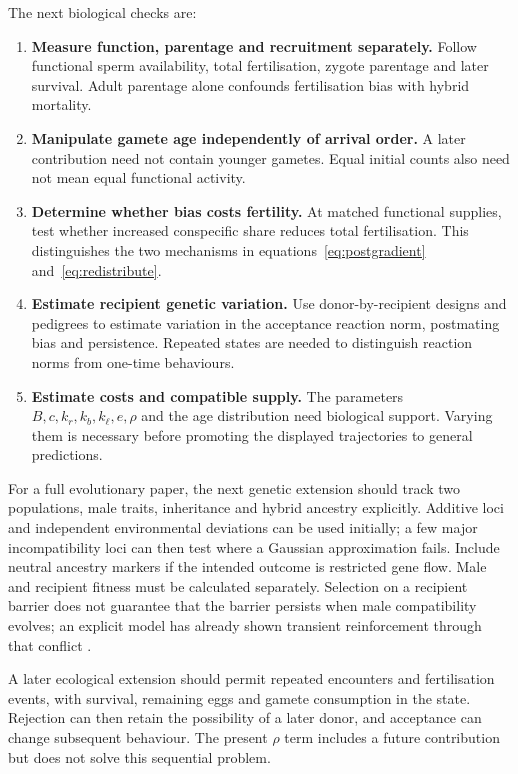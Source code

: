 \documentclass[11pt,a4paper]{article}
\begin{document}
The next biological checks are:
\begin{enumerate}
\item \textbf{Measure function, parentage and recruitment separately.} Follow functional sperm availability, total fertilisation, zygote parentage and later survival. Adult parentage alone confounds fertilisation bias with hybrid mortality.
\item \textbf{Manipulate gamete age independently of arrival order.} A later contribution need not contain younger gametes. Equal initial counts also need not mean equal functional activity.
\item \textbf{Determine whether bias costs fertility.} At matched functional supplies, test whether increased conspecific share reduces total fertilisation. This distinguishes the two mechanisms in equations~\eqref{eq:postgradient} and~\eqref{eq:redistribute}.
\item \textbf{Estimate recipient genetic variation.} Use donor-by-recipient designs and pedigrees to estimate variation in the acceptance reaction norm, postmating bias and persistence. Repeated states are needed to distinguish reaction norms from one-time behaviours.
\item \textbf{Estimate costs and compatible supply.} The parameters $B,c,k_r,k_b,k_\ell,e,\rho$ and the age distribution need biological support. Varying them is necessary before promoting the displayed trajectories to general predictions.
\end{enumerate}

For a full evolutionary paper, the next genetic extension should track two populations, male traits, inheritance and hybrid ancestry explicitly. Additive loci and independent environmental deviations can be used initially; a few major incompatibility loci can then test where a Gaussian approximation fails. Include neutral ancestry markers if the intended outcome is restricted gene flow. Male and recipient fitness must be calculated separately. Selection on a recipient barrier does not guarantee that the barrier persists when male compatibility evolves; an explicit model has already shown transient reinforcement through that conflict \citep{Rushworth2022}.

A later ecological extension should permit repeated encounters and fertilisation events, with survival, remaining eggs and gamete consumption in the state. Rejection can then retain the possibility of a later donor, and acceptance can change subsequent behaviour. The present $\rho$ term includes a future contribution but does not solve this sequential problem.
\end{document}

